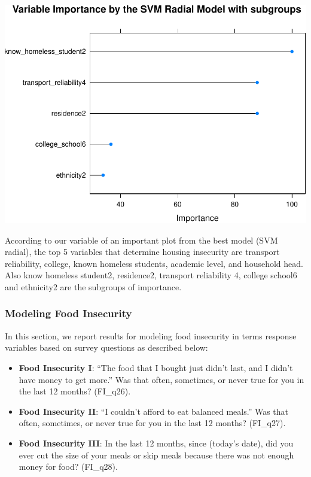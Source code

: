 \documentclass[
  10pt,
]{article}
\begin{document}
\begin{center}\includegraphics{phase2_report_files/figure-latex/unnamed-chunk-16-1} \end{center}

According to our variable of an important plot from the best model (SVM radial), the top 5 variables that determine housing insecurity are transport reliability, college, known homeless students, academic level, and household head. Also know homeless student2, residence2, transport reliability 4, college school6 and ethnicity2 are the subgroups of importance.\\

\hypertarget{modeling-food-insecurity}{%
\subsubsection{Modeling Food Insecurity}\label{modeling-food-insecurity}}

In this section, we report results for modeling food insecurity in terms response variables based on survey questions as described below:

\begin{itemize}
\item
  \textbf{Food Insecurity I}: ``The food that I bought just didn't last, and I didn't have money to get more.'' Was that often, sometimes, or never true for you in the last 12 months? (FI\_q26).
\item
  \textbf{Food Insecurity II}: ``I couldn't afford to eat balanced meals.'' Was that often, sometimes, or never true for you in the last 12 months? (FI\_q27).
\item
  \textbf{Food Insecurity III}: In the last 12 months, since (today's date), did you ever cut the size of your meals or skip meals because there was not enough money for food? (FI\_q28).
\end{itemize}
\end{document}
